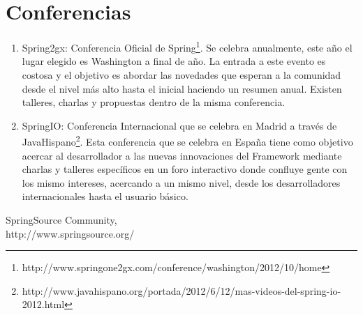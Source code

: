 \documentclass[11pt]{scrartcl}
\begin{document}
\section{Conferencias}

\begin{enumerate}
\item Spring2gx: Conferencia Oficial de Spring\footnote{http://www.springone2gx.com/conference/washington/2012/10/home}. Se celebra anualmente, este año el lugar elegido es Washington a final de año. La entrada a este evento es costosa y el objetivo es abordar las novedades que esperan a la comunidad desde el nivel más alto hasta el inicial haciendo un resumen anual. Existen talleres, charlas y propuestas dentro de la misma conferencia.
\item SpringIO: Conferencia Internacional que se celebra en Madrid a trav\'es de JavaHispano\footnote{http://www.javahispano.org/portada/2012/6/12/mas-videos-del-spring-io-2012.html}. Esta conferencia que se celebra en España tiene como objetivo acercar al desarrollador a las nuevas innovaciones del Framework mediante charlas y talleres específicos en un foro interactivo donde confluye gente con los mismo intereses, acercando a un mismo nivel, desde los desarrolladores internacionales hasta el usuario básico.
\end{enumerate}



\begin{thebibliography}{9}

  SpringSource Community,\\
  http://www.springsource.org/

\end{thebibliography}
\end{document}
